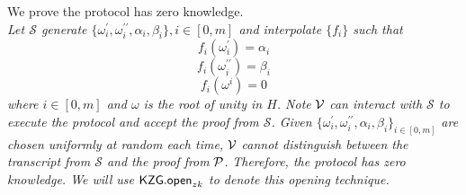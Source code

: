 \begin{enumerate}
\end{enumerate}

We prove the protocol has zero knowledge. \\
\textit{Let $\mathcal{S}$ generate $\{\omega_i^\prime,\omega_i^{\prime\prime},\alpha_i,\beta_i\},i\in[0,m]$ and interpolate $\{f_i\}$ such that}
\[ f_i(\omega_i^\prime)=\alpha_i \]
\[ f_i(\omega_i^{\prime\prime})=\beta_i \]
\[ f_i(\omega^i)=0 \]
\textit{where $i\in[0,m]$ and $\omega$ is the root of unity in $H$. Note} $\mathcal{V}$ \textit{can interact with $\mathcal{S}$ to execute the protocol and accept the proof from $\mathcal{S}$. Given $\{\omega_i^\prime,\omega_i^{\prime\prime},\alpha_i,\beta_i\}_{i\in[0,m]}$ are chosen uniformly at random each time,} $\mathcal{V}$ \textit{cannot distinguish between the transcript from $\mathcal{S}$ and the proof from} $\mathcal{P}$. \textit{Therefore, the protocol has zero knowledge. We will use} $\mathsf{KZG.open}_{zk}$ \textit{to denote this opening technique.}

